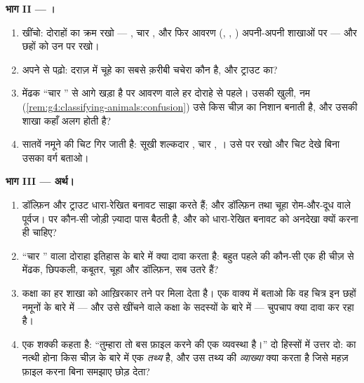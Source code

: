 \begin{problem}[{सप्ताहांत समस्या --- छह नमूने, एक अभिलक्षण-तालिका, और
एक वृक्ष}]
\medskip\noindent\textbf{भाग II --- ।}
\begin{enumerate}[resume]
  \item {} खींचो: दोराहों का क्रम रखो --- , चार , और फिर
        आवरण (, , ) अपनी-अपनी शाखाओं पर --- और छहों को उन पर
        रखो।
  \item अपने  से पढ़ो: दराज़ में चूहे का सबसे क़रीबी चचेरा कौन है,
        और ट्राउट का?
  \item मेंढक ``चार '' से आगे खड़ा है पर आवरण वाले हर दोराहे से
        पहले। उसकी खुली, नम 
        (\cref{rem:g4:classifying-animals:confusion}) उसे किस चीज़ का
        निशान बनाती है, और उसकी शाखा कहाँ अलग होती है?
  \item सातवें नमूने की चिट गिर जाती है: सूखी शल्कदार , चार ,
        । उसे  पर रखो और चिट देखे बिना उसका वर्ग बताओ।
\end{enumerate}

\medskip\noindent\textbf{भाग III --- अर्थ।}
\begin{enumerate}[resume]
  \item डॉल्फ़िन और ट्राउट धारा-रेखित बनावट साझा करते हैं; और डॉल्फ़िन
        तथा चूहा रोम-और-दूध वाले पूर्वज।  पर कौन-सी जोड़ी ज़्यादा
        पास बैठती है, और  को धारा-रेखित बनावट को अनदेखा क्यों
        करना ही चाहिए?
  \item ``चार '' वाला दोराहा इतिहास के बारे में क्या दावा करता
        है: बहुत पहले की कौन-सी एक ही चीज़ से मेंढक, छिपकली, कबूतर,
        चूहा और डॉल्फ़िन, सब उतरे हैं?
  \item कक्षा का  हर शाखा को आख़िरकार तने पर मिला देता है। एक
        वाक्य में बताओ कि वह चित्र इन छहों नमूनों के बारे में ---
        और उसे खींचने वाले कक्षा के सदस्यों के बारे में --- चुपचाप
        क्या दावा कर रहा है।
  \item एक शक्की कहता है: ``तुम्हारा  तो बस फ़ाइल करने की एक
        व्यवस्था है।'' दो हिस्सों में उत्तर दो:  का नत्थी
        होना किस चीज़ के बारे में एक \emph{तथ्य} है, और  उस तथ्य
        की \emph{व्याख्या} क्या करता है जिसे महज़ फ़ाइल करना बिना
        समझाए छोड़ देता?
\end{enumerate}
\end{problem}
